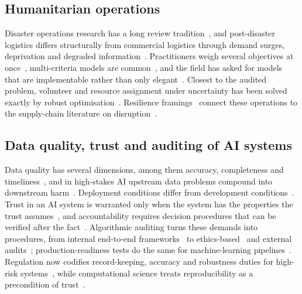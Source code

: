 \documentclass[systems,article,submit,moreauthors,pdftex]{Definitions/mdpi}
\begin{document}
\subsection{Humanitarian operations}
Disaster operations research has a long review
tradition~\cite{altay2006ormsdisaster,galindo2013review,caunhye2012emergency}, and
post-disaster logistics differs structurally from commercial logistics through demand
surges, deprivation and degraded information~\cite{holguinveras2012unique,kovacs2007humanitarian,sheu2007emergency}.
Practitioners weigh several objectives at once~\cite{gralla2014tradeoffs}, multi-criteria
models are common~\cite{gutjahr2016multicriteria}, and the field has asked for models that
are implementable rather than only elegant~\cite{besiou2020humanitarian}. Closest to the
audited problem, volunteer and resource assignment under uncertainty has been solved
exactly by robust optimisation~\cite{lassiter2015volunteer}. Resilience
framings~\cite{bruneau2003resilience,christopher2004resilient,sheffi2005resilient,hosseini2019review}
connect these operations to the supply-chain literature on
disruption~\cite{queiroz2022epidemic,aghsami2024humanitarian}.

\subsection{Data quality, trust and auditing of AI systems}
Data quality has several dimensions, among them accuracy, completeness and
timeliness~\cite{wang1996dataquality}, and in high-stakes AI upstream data problems
compound into downstream harm~\cite{sambasivan2021cascades}. Deployment conditions differ
from development conditions~\cite{quinonerocandela2008shift,amodei2016concrete}.
Trust in an AI system is warranted only when the system has the properties the trust
assumes~\cite{jacovi2021trust}, and accountability requires decision procedures that can
be verified after the fact~\cite{kroll2017accountable,doshivelez2017interpretable}.
Algorithmic auditing turns these demands into procedures, from internal end-to-end
frameworks~\cite{raji2020audit} to ethics-based~\cite{mokander2021ethics} and external
audits~\cite{metaxa2021auditing}; production-readiness tests do the same for machine-learning
pipelines~\cite{breck2017mltestscore}. Regulation now codifies record-keeping, accuracy and
robustness duties for high-risk systems~\cite{eu2024aiact}, while computational science
treats reproducibility as a precondition of trust~\cite{peng2011reproducible,stodden2016enhancing,gundersen2018reproducibility,pineau2021reproducibility,wilkinson2016fair}.
\end{document}
